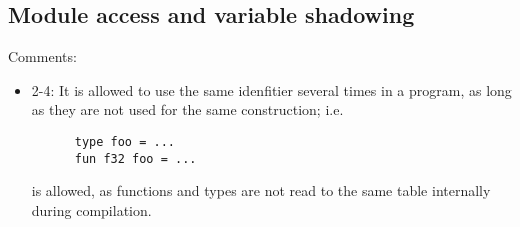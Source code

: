 \subsection{Module access and variable shadowing}

Comments:
\begin{itemize}
  \item 2-4: It is allowed to use the same idenfitier several times in a
    program, as long as they are not used for the same construction; i.e.
    \begin{verbatim}
      type foo = ...
      fun f32 foo = ...
    \end{verbatim} is allowed, as functions and types are not read to the same
    table internally during compilation.
  \end{itemize}

